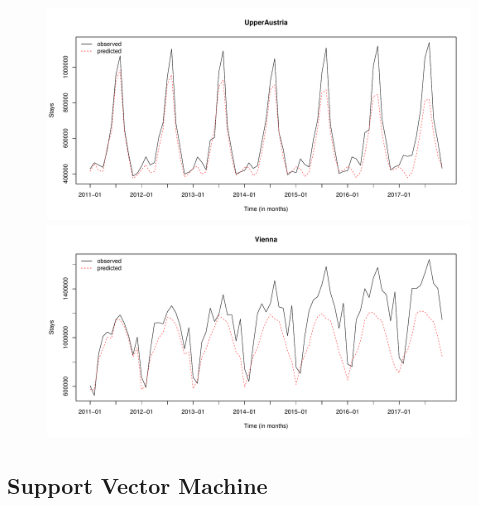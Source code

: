 \documentclass[a4paper,reqno,]{article}
\begin{document}
\begin{figure}[H]
\begin{minipage}[b]{0.5\textwidth}
\centering
  \includegraphics[width=\textwidth]
  {images/ANN/4_UpperAustria_.pdf}
\end{minipage}
\begin{minipage}[b]{0.5\textwidth}
\centering
  \includegraphics[width=\textwidth]{images/ANN/9_Vienna_.pdf}
\end{minipage}
       \label{fig:nstep_ann}
\end{figure}


 
\newpage
\subsection{Support Vector Machine}
\label{ssec:svm}
\end{document}
